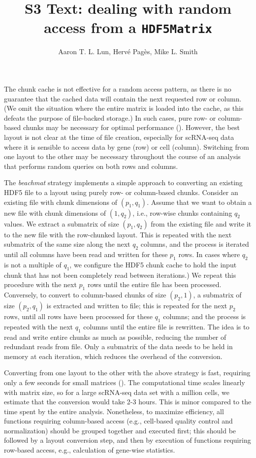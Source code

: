\documentclass{article}
\title{S3 Text: dealing with random access from a \texttt{HDF5Matrix}}
\author{Aaron T. L. Lun, Herv\'e Pag\`es, Mike L. Smith}
\newcommand{\beachmat}{\textit{beachmat}}
\begin{document}
\maketitle

\noindent
The chunk cache is not effective for a random access pattern, as there is no guarantee that the cached data will contain the next requested row or column.
(We omit the situation where the entire matrix is loaded into the cache, as this defeats the purpose of file-backed storage.)
In such cases, pure row- or column-based chunks may be necessary for optimal performance (\suppfighdfrandomchunk{}).
However, the best layout is not clear at the time of file creation, especially for scRNA-seq data where it is sensible to access data by gene (row) or cell (column).
Switching from one layout to the other may be necessary throughout the course of an analysis that performs random queries on both rows and columns.

The \beachmat{} strategy implements a simple approach to converting an existing HDF5 file to a layout using purely row- or column-based chunks.
Consider an existing file with chunk dimensions of $(p_1, q_1)$. 
Assume that we want to obtain a new file with chunk dimensions of $(1, q_2)$, i.e., row-wise chunks containing $q_2$ values.
We extract a submatrix of size $(p_1, q_2)$ from the existing file and write it to the new file with the row-chunked layout.
This is repeated with the next submatrix of the same size along the next $q_2$ columns, and the process is iterated until all columns have been read and written for these $p_1$ rows.
In cases where $q_2$ is not a multiple of $q_1$, we configure the HDF5 chunk cache to hold the input chunk that has not been completely read between iterations.)
We repeat this procedure with the next $p_1$ rows until the entire file has been processed.
Conversely, to convert to column-based chunks of size $(p_2, 1)$, a submatrix of size $(p_2, q_1)$ is extracted and written to file; this is repeated for the next $p_2$ rows, until all rows have been processed for these $q_1$ columns; and the process is repeated with the next $q_1$ columns until the entire file is rewritten.
The idea is to read and write entire chunks as much as possible, reducing the number of redundant reads from file.
Only a submatrix of the data needs to be held in memory at each iteration, which reduces the overhead of the conversion.

Converting from one layout to the other with the above strategy is fast, requiring only a few seconds for small matrices (\suppfighdfrandomrechunk{}).
The computational time scales linearly with matrix size, so for a large scRNA-seq data set with a million cells, we estimate that the conversion would take 2-3 hours.
This is minor compared to the time spent by the entire analysis.
Nonetheless, to maximize efficiency, all functions requiring column-based access (e.g., cell-based quality control and normalization) should be grouped together and executed first; 
this should be followed by a layout conversion step, and then by execution of functions requiring row-based access, e.g., calculation of gene-wise statistics.
\end{document}
